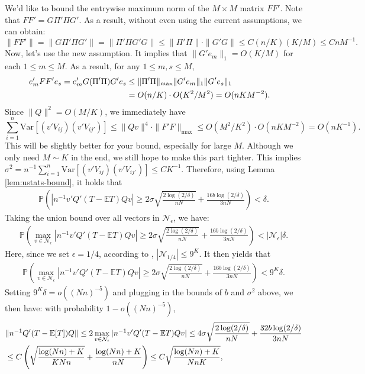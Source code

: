 \documentclass[preprint,11pt]{article}
\newcommand{\mbb}{\mathbb}
\newcommand{\Var}{\text{Var}}
\newcommand{\mcal}{\mathcal}
\numberwithin{equation}{section}
\begin{document}
{\color{blue}
We'd like to bound the entrywise maximum norm of the $M\times M$ matrix $FF'$. Note that  
$FF' = G\Pi'\Pi G'$. 
As a result, without even using the current assumptions, we can obtain: \[
\|FF'\|=\|G\Pi'\Pi G'\|=\|\Pi'\Pi G'G\|\leq \|\Pi'\Pi\|\cdot \|G'G\|\leq C(n/K)(K/M)\leq CnM^{-1}. 
\]
Now, let's use the new assumption. It implies that $\|G'e_m\|_1=O(K/M)$ for each $1\leq m\leq M$. As a result, for any $1\leq m,s\leq M$, 
\begin{align*}
e_m'FF'e_{s} = e_m'G(\Pi'\Pi) G'e_{s}& \leq \|\Pi'\Pi\|_{\max} \|G' e_m\|_1 \|G'e_s\|_1 \cr
&= O(n/K)\cdot O(K^2/M^2)=  O(nKM^{-2}).  
\end{align*}
Since $\|Q\|^2=O(M/K)$, we immediately have 
\[
\sum_{i=1}^n\Var\left[(v'V_{ij})(v'V_{ij'})\right]\leq \|Qv\|^4\cdot \|F'F\|_{\max}\leq O(M^2/K^2)\cdot O(nKM^{-2}) = O(nK^{-1}). 
\]
This will be slightly better for your bound, especially for large $M$. Although we only need $M\sim K$ in the end, we still hope to make this part tighter. 
}
\fi
This implies $\sigma^2=n^{-1}\sum_{i=1}^n\Var\left[(v'V_{ij})(v'V_{ij'})\right]\le CK^{-1}$. Therefore, using Lemma \ref{lem:ustats-bound}, it holds that 
\begin{align*}
    \mbb{P}\left(|n^{-1}v'Q'(T-\mathbb{E}T)Qv|\ge 2\sigma\sqrt{\frac{2\log(2/\delta)}{nN}}+\frac{16b\log(2/\delta)}{3nN}\right)< \delta.
\end{align*}
Taking the union bound over all vectors in $\mcal{N}_{\epsilon}$, we have:
\begin{align*}
    \mbb{P}\left(\max_{v\in\mcal{N}_\epsilon}|n^{-1}v'Q'(T-\mathbb{E}T)Qv|\ge 2\sigma\sqrt{\frac{2\log(2/\delta)}{nN}}+\frac{16b\log(2/\delta)}{3nN}\right)< |\mcal{N}_{\epsilon}|\delta.
\end{align*}
Here, since we set $\epsilon=1/4$, according to \cite[Lemma 5.2]{vershynin2010introduction}, $|\mcal{N}_{1/4}|\le 9^K$. It then yields that
\begin{align*}
    \mbb{P}\left(\max_{v\in\mcal{N}_\epsilon}|n^{-1}v'Q'(T-\mathbb{E}T)Qv|\ge 2\sigma\sqrt{\frac{2\log(2/\delta)}{nN}}+\frac{16b\log(2/\delta)}{3nN}\right)< 9^K\delta.
\end{align*}
Setting $9^K\delta=o((Nn)^{-5})$ and plugging in the bounds of $b$ and $\sigma^2$ above, we then have: with probability $1-o((Nn)^{-5})$,
\begin{align*}
    &\|n^{-1}Q'(T-\mbb{E}[T])Q\|\le 2\max_{v\in{\cal N}_\epsilon}|n^{-1}v'Q'(T-\mathbb{E}T)Qv|\le 4\sigma\sqrt{\frac{2\log(2/\delta)}{nN}}+\frac{32b\log(2/\delta)}{3nN}\\
    &\le C\left(\sqrt{\frac{\log (Nn)+K}{KNn}}+\frac{\log (Nn)+K}{nN}\right)\le C\sqrt{\frac{\log (Nn)+K}{NnK}},
\end{align*}
\end{document}
